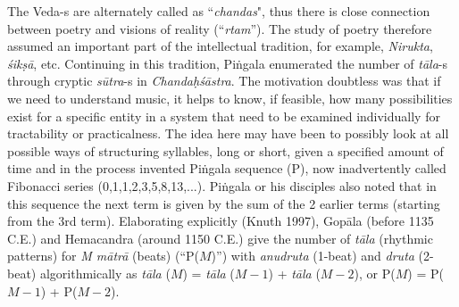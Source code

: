The Veda-s are alternately called as “\textsl{chandas}", thus there is close connection between poetry and visions of reality (“\textsl{rtam}”). The study of poetry therefore assumed an important part of the intellectual tradition, for example, \textsl{Nirukta}, \textsl{śikṣā}, etc. Continuing in this tradition, Piṅgala enumerated the number of \textsl{tāla}-s through cryptic \textsl{sūtra}-s in \textsl{Chandaḥśāstra}. The motivation doubtless was that if we need to understand music, it helps to know, if feasible, how many possibilities exist for a specific entity in a system that need to be examined individually for tractability or practicalness. The idea here may have been to possibly look at all possible ways of structuring syllables, long or short, given a specified amount of time and in the process invented Piṅgala sequence (P), now inadvertently called Fibonacci series (0,1,1,2,3,5,8,13,...). Piṅgala
 or his disciples also noted that in this sequence the next term is given by the sum of the 2 earlier terms (starting from the 3rd term). Elaborating explicitly (Knuth 1997), Gopāla (before 1135 C.E.) and Hemacandra (around 1150 C.E.) give the number of \textsl{tāla} (rhythmic patterns) for \textsl{M mātrā} (beats) (“P($M$)”) with \textsl{anudruta} (1-beat) and \textsl{druta} (2-beat) algorithmically as \textsl{tāla} ($M$) = \textsl{tāla} ($M-1$) + \textsl{tāla} ($M-2$), or P($M$) = P($M-1$) + P($M-2$).

